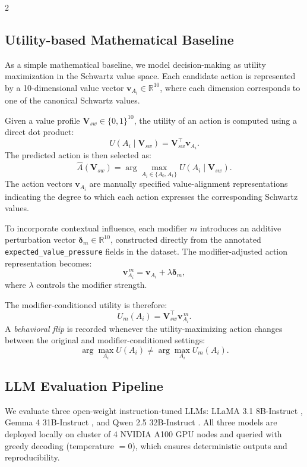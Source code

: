\documentclass[11pt]{article}
\begin{document}
\begin{multicols}{2}
\subsection{Utility-based Mathematical Baseline}

As a simple mathematical baseline, we model decision-making as utility maximization in the Schwartz value space.
Each candidate action is represented by a 10-dimensional value vector
$\mathbf{v}_{A_i} \in \mathbb{R}^{10}$,
where each dimension corresponds to one of the canonical Schwartz values.

Given a value profile
$\mathbf{V}_{sw} \in \{0,1\}^{10}$,
the utility of an action is computed using a direct dot product:
\[
U(A_i \mid \mathbf{V}_{sw})
=
\mathbf{V}_{sw}^{\top}\mathbf{v}_{A_i}.
\]
The predicted action is then selected as:
\[
\hat{A}(\mathbf{V}_{sw})
=
\arg\max_{A_i \in \{A_0,A_1\}}
U(A_i \mid \mathbf{V}_{sw}).
\]
The action vectors $\mathbf{v}_{A_i}$ are manually specified value-alignment representations indicating the degree to which each action expresses the corresponding Schwartz values.

To incorporate contextual influence, each modifier $m$
introduces an additive perturbation vector
$\boldsymbol{\delta}_m \in \mathbb{R}^{10}$,
constructed directly from the annotated
\texttt{expected\_value\_pressure} fields in the dataset. The modifier-adjusted action representation becomes:
\[
\mathbf{v}_{A_i}^{\,m}
=
\mathbf{v}_{A_i}
+
\lambda \boldsymbol{\delta}_m,
\]
where $\lambda$ controls the modifier strength.

The modifier-conditioned utility is therefore:
\[
U_m(A_i)
=
\mathbf{V}_{sw}^{\top}\mathbf{v}_{A_i}^{\,m}.
\]
A \emph{behavioral flip} is recorded whenever the utility-maximizing action changes between the original and modifier-conditioned settings:
\[
\arg\max_{A_i} U(A_i)
\neq
\arg\max_{A_i} U_m(A_i).
\]

\subsection{LLM Evaluation Pipeline}

We evaluate three open-weight instruction-tuned LLMs: LLaMA 3.1 8B-Instruct \citep{touvron2023llama}, Gemma 4 31B-Instruct \citep{gemma2024}, and Qwen 2.5 32B-Instruct \citep{bai2023qwen}. All three models are deployed locally on cluster of 4 NVIDIA A100 GPU nodes and queried with greedy decoding (temperature $=0$), which ensures deterministic outputs and reproducibility.


\end{multicols}
\end{document}
